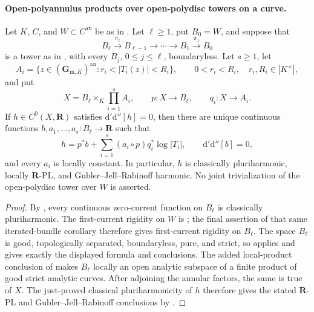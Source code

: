 \paragraph{Open-polyannulus products over open-polydisc towers on a curve.}
\begin{corollary}
\label{cor:p062-open-polyannulus-over-open-polydisc-towers}
Let \(K\), \(C\), and \(W\subset C^{\mathrm{an}}\) be as in
.  Let \(\ell\geq1\), put \(B_0=W\),
and suppose that
\[
 B_\ell\xrightarrow{\pi_\ell}B_{\ell-1}
 \longrightarrow\cdots\longrightarrow B_1
 \xrightarrow{\pi_1}B_0
\]
is a tower as in
, with every
\(B_j\), \(0\leq j\leq\ell\), boundaryless.  Let \(s\geq1\), let
\[
 A_i=\{z\in(\mathbf G_{\mathrm m,K})^{\mathrm{an}}:
                     r_i<|T_i(z)|<R_i\},
 \qquad 0<r_i<R_i,\quad r_i,R_i\in|K^\times|,
\]
and put
\[
 X=B_\ell\times_K\prod_{i=1}^sA_i,
 \qquad p:X\longrightarrow B_\ell,
 \qquad q_i:X\longrightarrow A_i.
\]
If \(h\in C^0(X,\mathbf R)\) satisfies
\(\mathrm d'\mathrm d''[h]=0\), then there are unique continuous
functions \(b,a_1,\ldots,a_s:B_\ell\to\mathbf R\) such that
\[
 h=p^*b+\sum_{i=1}^s(a_i\circ p)q_i^*\log|T_i|,
 \qquad \mathrm d'\mathrm d''[b]=0,
\]
and every \(a_i\) is locally constant.  In particular, \(h\) is
classically pluriharmonic, locally \(\mathbf R\)-PL, and
Gubler--Jell--Rabinoff harmonic.  No joint trivialization of the
open-polydisc tower over \(W\) is asserted.
\end{corollary}

\begin{proof}
By , every
continuous zero-current function on \(B_\ell\) is classically
pluriharmonic.  The first-current rigidity on \(W\) is
; the final assertion of that
same iterated-bundle corollary therefore gives first-current rigidity on
\(B_\ell\).  The space \(B_\ell\) is good, topologically separated,
boundaryless, pure, and strict, so
 applies and gives exactly the
displayed formula and conclusions.
The added local-product conclusion of
 makes \(B_\ell\)
locally an open analytic subspace of a finite product of good strict
analytic curves.  After adjoining the annular factors, the same is true of
\(X\).  The just-proved classical pluriharmonicity of \(h\) therefore gives
the stated \(\mathbf R\)-PL and Gubler--Jell--Rabinoff conclusions by
.
\end{proof}

